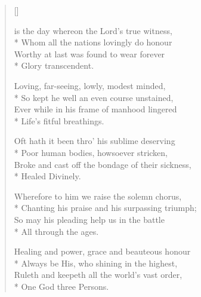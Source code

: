\newHymn


\begin{verse}[\versewidth]
\begin{patverse}
 is the day whereon the Lord's true witness,\\*
Whom all the nations lovingly do honour\\
Worthy at last was found to wear forever\\*
Glory transcendent.
\end{patverse}

\begin{patverse}
 Loving, far-seeing, lowly, modest minded,\\*
So kept he well an even course unstained,\\
Ever while in his frame of manhood lingered\\*
Life's fitful breathings.
\end{patverse}

\begin{patverse}
 Oft hath it been thro' his sublime deserving\\*
Poor human bodies, howsoever stricken,\\
Broke and cast off the bondage of their sickness,\\*
Healed Divinely.
\end{patverse}

\begin{patverse}
 Wherefore to him we raise the solemn chorus,\\*
Chanting his praise and his surpassing triumph;\\
So may his pleading help us in the battle\\*
All through the ages.
\end{patverse}

\begin{patverse}
 Healing and power, grace and beauteous honour\\*
Always be His, who shining in the highest,\\
Ruleth and keepeth all the world's vast order,\\*
One God three Persons.
\end{patverse}

\end{verse}



